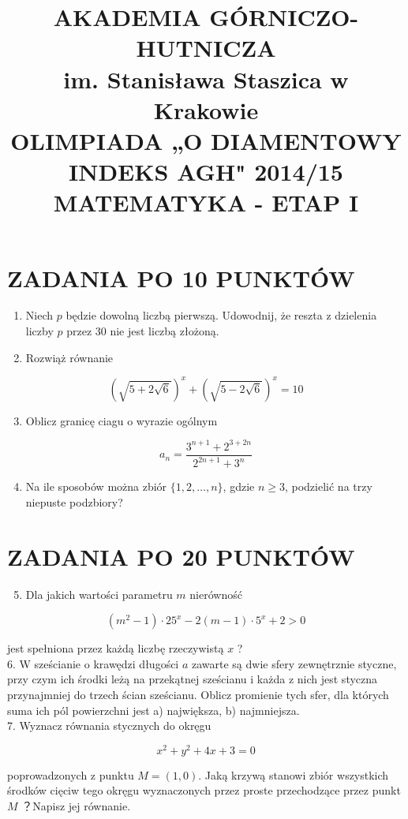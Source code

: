 \documentclass[10pt]{article}
\title{AKADEMIA GÓRNICZO-HUTNICZA \\
 im. Stanisława Staszica w Krakowie \\
 OLIMPIADA „O DIAMENTOWY INDEKS AGH" 2014/15 \\
 MATEMATYKA - ETAP I }
\author{}
\date{}
\begin{document}
\maketitle
\section*{ZADANIA PO 10 PUNKTÓW}
\begin{enumerate}
  \item Niech $p$ będzie dowolną liczbą pierwszą. Udowodnij, że reszta z dzielenia liczby $p$ przez 30 nie jest liczbą złożoną.
  \item Rozwiąż równanie
\end{enumerate}

$$
(\sqrt{5+2 \sqrt{6}})^{x}+(\sqrt{5-2 \sqrt{6}})^{x}=10
$$

\begin{enumerate}
  \setcounter{enumi}{2}
  \item Oblicz granicę ciagu o wyrazie ogólnym
\end{enumerate}

$$
a_{n}=\frac{3^{n+1}+2^{3+2 n}}{2^{2 n+1}+3^{n}}
$$

\begin{enumerate}
  \setcounter{enumi}{3}
  \item Na ile sposobów można zbiór $\{1,2, \ldots, n\}$, gdzie $n \geq 3$, podzielić na trzy niepuste podzbiory?
\end{enumerate}

\section*{ZADANIA PO 20 PUNKTÓW}
\begin{enumerate}
  \setcounter{enumi}{4}
  \item Dla jakich wartości parametru $m$ nierówność
\end{enumerate}

$$
\left(m^{2}-1\right) \cdot 25^{x}-2(m-1) \cdot 5^{x}+2>0
$$

jest spełniona przez każdą liczbę rzeczywistą $x$ ?\\
6. W sześcianie o krawędzi długości $a$ zawarte są dwie sfery zewnętrznie styczne, przy czym ich środki leżą na przekątnej sześcianu i każda z nich jest styczna przynajmniej do trzech ścian sześcianu. Oblicz promienie tych sfer, dla których suma ich pól powierzchni jest a) największa, b) najmniejsza.\\
7. Wyznacz równania stycznych do okręgu

$$
x^{2}+y^{2}+4 x+3=0
$$

poprowadzonych z punktu $M=(1,0)$. Jaką krzywą stanowi zbiór wszystkich środków cięciw tego okręgu wyznaczonych przez proste przechodzące przez punkt $M$ ？Napisz jej równanie.
\end{document}
